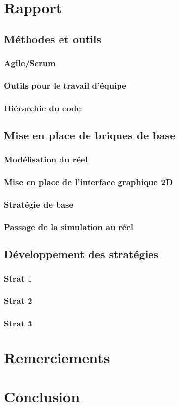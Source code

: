 \documentclass[12pt]{article}
\begin{document}
\newpage

\section{Rapport}
\subsection{Méthodes et outils}
\subsubsection{Agile/Scrum}
\subsubsection{Outils pour le travail d'équipe}
\subsubsection{Hiérarchie du code}
\subsection{Mise en place de briques de base}
\subsubsection{Modélisation du réel}
\subsubsection{Mise en place de l'interface graphique 2D}
\subsubsection{Stratégie de base}
\subsubsection{Passage de la simulation au réel}
\subsection{Développement des stratégies}
\subsubsection{Strat 1}
\subsubsection{Strat 2}
\subsubsection{Strat 3}

\newpage

\section{Remerciements}

\newpage

\section{Conclusion}
\end{document}
